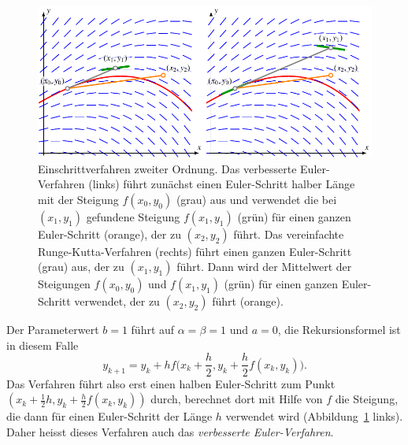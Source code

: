 \begin{figure}
\centering
\includegraphics{chapters/50-ode/figures/ordnung2.pdf}
\caption{Einschrittverfahren zweiter Ordnung.
%
%
Das verbesserte Euler-Verfahren (links) führt zunächst einen Euler-Schritt
halber Länge mit der Steigung $f(x_0,y_0)$ (grau) aus und verwendet
die bei $(x_1,y_1)$ gefundene Steigung 
$f(x_1,y_1)$ (grün) für einen ganzen Euler-Schritt (orange),
der zu $(x_2,y_2)$ führt.
%
%
Das vereinfachte Runge-Kutta-Verfahren (rechts) führt einen ganzen
Euler-Schritt (grau) aus, der zu $(x_1,y_1)$ führt.
Dann wird der Mittelwert der Steigungen $f(x_0,y_0)$ und $f(x_1,y_1)$
(grün) für einen ganzen Euler-Schritt verwendet, der zu $(x_2,y_2)$ führt
(orange).
\label{buch:einschritt:figure:ordnung2}}
\end{figure}

Der Parameterwert $b=1$ führt auf $\alpha=\beta=1$ und $a=0$, die
Rekursionsformel ist in diesem Falle
\begin{equation}
y_{k+1}=y_{k}+hf\biggl(x_k+\frac{h}2,y_k+\frac{h}2 f(x_k,y_k)\biggr).
\label{buch:ode:improved-euler}
\end{equation}
Das Verfahren führt also erst einen halben Euler-Schritt zum Punkt
$(x_k+\frac12h,y_k+\frac{h}2f(x_k,y_k))$ durch, berechnet dort mit Hilfe
von $f$ die Steigung, die dann für einen Euler-Schritt der Länge $h$
verwendet wird
(Abbildung~\ref{buch:einschritt:figure:ordnung2} links).
Daher heisst dieses Verfahren auch das {\em verbesserte Euler-Verfahren}.
%
%

